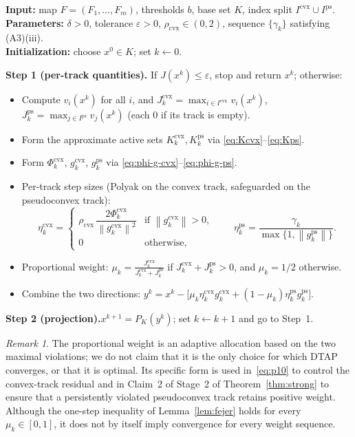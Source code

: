 \documentclass[]{interact}
\theoremstyle{plain}
\theoremstyle{definition}
\theoremstyle{remark}
\newtheorem{remark}{Remark}
\newcommand{\algstep}[1]{\smallskip\noindent\textbf{#1}}
\newcommand{\norm}[1]{\left\lVert #1 \right\rVert}
\newcommand{\cvx}{\mathrm{cvx}}
\newcommand{\ps}{\mathrm{ps}}
\begin{document}
\begin{algorithm}[H]
\caption{Dual-Track Adaptive Projection (DTAP) for the normal-box NSFP
\eqref{eq:nsfp-box}.}
\label{alg:dtap}
\small
\noindent\textbf{Input:} map $F=(F_1,\dots,F_m)$, thresholds $b$, base set $K$, index
split $I^{\cvx}\cup I^{\ps}$.\\
\textbf{Parameters:} $\delta>0$, tolerance $\varepsilon>0$, $\rho_{\cvx}\in(0,2)$,
sequence $\{\gamma_k\}$ satisfying (A3)(iii).\\
\textbf{Initialization:} choose $x^0\in K$; set $k\leftarrow 0$.

\algstep{Step 1 (per-track quantities).} If $J(x^k)\le\varepsilon$, stop and return $x^k$; otherwise:
\begin{itemize}[leftmargin=1.6em,itemsep=1pt,topsep=2pt]
\item[(1a)] Compute $v_i(x^k)$ for all $i$, and $J^{\cvx}_k=\max_{i\in I^{\cvx}}v_i(x^k)$,
$J^{\ps}_k=\max_{j\in I^{\ps}}v_j(x^k)$ (each $0$ if its track is empty).
\item[(1b)] Form the approximate active sets $K^{\cvx}_k,K^{\ps}_k$ via
\eqref{eq:Kcvx}--\eqref{eq:Kps}.
\item[(1c)] Form $\Phi^{\cvx}_k$, $g^{\cvx}_k$, $g^{\ps}_k$ via
\eqref{eq:phi-g-cvx}--\eqref{eq:phi-g-ps}.
\item[(1d)] Per-track step sizes (Polyak on the convex track, safeguarded on the
pseudoconvex track):
\[
\eta^{\cvx}_k=\begin{cases}\rho_{\cvx}\,\dfrac{2\Phi^{\cvx}_k}{\norm{g^{\cvx}_k}^2} & \text{if }\norm{g^{\cvx}_k}>0,\\ 0 & \text{otherwise,}\end{cases}
\qquad
\eta^{\ps}_k=\frac{\gamma_k}{\max\{1,\norm{g^{\ps}_k}\}} .
\]
\item[(1e)] Proportional weight:
$\displaystyle \mu_k=\frac{J^{\cvx}_k}{J^{\cvx}_k+J^{\ps}_k}$ if
$J^{\cvx}_k+J^{\ps}_k>0$, and $\mu_k=1/2$ otherwise.
\item[(1f)] Combine the two directions:
$\displaystyle y^k=x^k-\bigl[\mu_k\eta^{\cvx}_k g^{\cvx}_k+(1-\mu_k)\eta^{\ps}_k g^{\ps}_k\bigr].$
\end{itemize}
\algstep{Step 2 (projection).}\quad $x^{k+1}=P_K(y^k)$; set $k\leftarrow k+1$ and go to Step~1.
\end{algorithm}

\begin{remark}\label{rem:weight-scope}
The proportional weight is an adaptive allocation based on the two maximal violations;
we do not claim that it is the only choice for which DTAP converges, or that it is optimal.
Its specific form is used in~\eqref{eq:p10} to control the convex-track residual and in
Claim~2 of Stage~2 of Theorem~\ref{thm:strong} to ensure that a persistently violated
pseudoconvex track retains positive weight. Although the one-step inequality of Lemma~\ref{lem:fejer} holds
for every $\mu_k\in[0,1]$, it does not by itself imply convergence for every weight sequence.
\end{remark}
\end{document}
